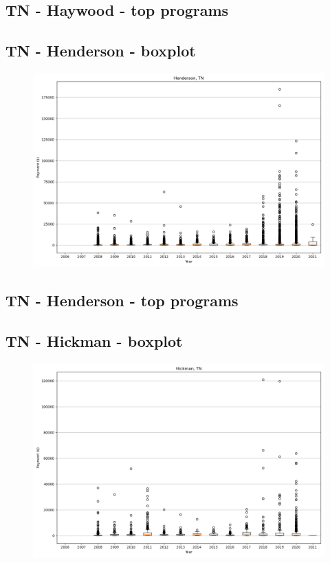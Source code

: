 \subsection*{TN - Haywood - top programs}

\newpage
\subsection*{TN - Henderson - boxplot}
\begin{figure}[h]
\centering
\includegraphics[width=7in]{../output/boxplots/counties/Henderson-TN_boxplot.png}
\end{figure}


\subsection*{TN - Henderson - top programs}

\newpage
\subsection*{TN - Hickman - boxplot}
\begin{figure}[h]
\centering
\includegraphics[width=7in]{../output/boxplots/counties/Hickman-TN_boxplot.png}
\end{figure}


